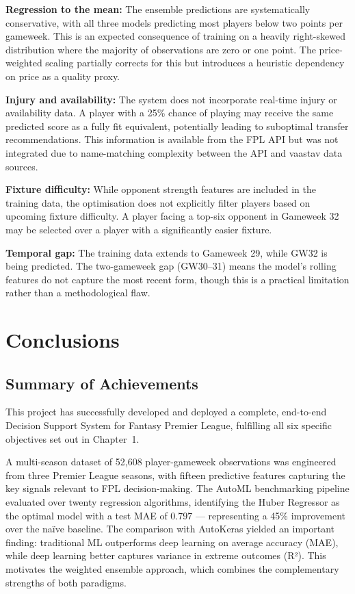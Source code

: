 \documentclass[11pt,english,listoffigures,listoftables]{tfgetsinf}
\begin{document}
\textbf{Regression to the mean:} The ensemble predictions are systematically conservative, with all three models predicting most players below two points per gameweek. This is an expected consequence of training on a heavily right-skewed distribution where the majority of observations are zero or one point. The price-weighted scaling partially corrects for this but introduces a heuristic dependency on price as a quality proxy.

\textbf{Injury and availability:} The system does not incorporate real-time injury or availability data. A player with a 25\% chance of playing may receive the same predicted score as a fully fit equivalent, potentially leading to suboptimal transfer recommendations. This information is available from the FPL API but was not integrated due to name-matching complexity between the API and vaastav data sources.

\textbf{Fixture difficulty:} While opponent strength features are included in the training data, the optimisation does not explicitly filter players based on upcoming fixture difficulty. A player facing a top-six opponent in Gameweek 32 may be selected over a player with a significantly easier fixture.

\textbf{Temporal gap:} The training data extends to Gameweek 29, while GW32 is being predicted. The two-gameweek gap (GW30--31) means the model's rolling features do not capture the most recent form, though this is a practical limitation rather than a methodological flaw.


\chapter{Conclusions}
\label{chap:conclusions}

\section{Summary of Achievements}

This project has successfully developed and deployed a complete, end-to-end Decision Support System for Fantasy Premier League, fulfilling all six specific objectives set out in Chapter~1.

A multi-season dataset of 52,608 player-gameweek observations was engineered from three Premier League seasons, with fifteen predictive features capturing the key signals relevant to FPL decision-making. The AutoML benchmarking pipeline evaluated over twenty regression algorithms, identifying the Huber Regressor as the optimal model with a test MAE of 0.797 --- representing a 45\% improvement over the naïve baseline. The comparison with AutoKeras yielded an important finding: traditional ML outperforms deep learning on average accuracy (MAE), while deep learning better captures variance in extreme outcomes (R²). This motivates the weighted ensemble approach, which combines the complementary strengths of both paradigms.
\end{document}
